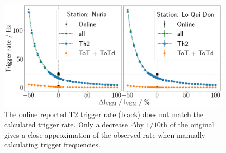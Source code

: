 \begin{figure}
	\centering
	\includegraphics[width=\textwidth]{./plots/random_traces_correction_factor.png}
	\caption{The online reported T2 trigger rate (black) does not match the calculated trigger rate. Only a decrease $\Delta$\Ipeak by $1/10$th of the original 
	\Ipeak gives a close approximation of the observed rate when manually calculating trigger frequencies.}
	\label{fig:random-traces-correction}
\end{figure}


